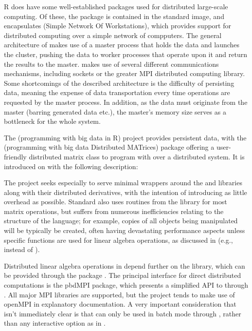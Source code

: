 R does have some well-established packages used for distributed
large-scale computing. Of these, the  package is
contained in the standard \R image, and encapsulates 
(Simple Network Of Workstations), which provides support for distributed
computing over a simple network of compputers. The general architecture
of  makes use of a master process that holds the data and
launches the cluster, pushing the data to worker processes that operate
upon it and return the results to the master.  makes use of
several different communications mechanisms, including sockets or the
greater MPI distributed computing library. Some shortcomings of the
described architecture is the difficulty of persisting data, meaning the
expense of data transportation every time operations are requested by
the master process. In addition, as the data must originate from the
master (barring generated data etc.), the master's memory size serves as
a bottleneck for the whole system.

The  (programming with big data in R) project provides
persistent data, with the  (programming with big data
Distributed MATrices) package offering a user-friendly distributed
matrix class to program with over a distributed system. It is introduced
on with the following description:


The project seeks especially to serve minimal wrappers around the 
and  libraries along with their distributed derivatives, with the
intention of introducing as little overhead as possible. Standard \R also
uses routines from the library for most matrix operations, but suffers
from numerous inefficiencies relating to the structure of the language;
for example, copies of all objects being manipulated will be typically
be created, often having devastating performance aspects unless specific
functions are used for linear algebra operations, as discussed in
\textcite{schmidt2017programming} (e.g.,
 instead of ).

Distributed linear algebra operations in  depend further on the
 library, which can be provided through the  package
\cite{Chen2012pbdSLAPpackage}. The principal interface for direct
distributed computations is the pbdMPI package, which presents a
simplified API to  through \R \cite{Chen2012pbdMPIpackage}. All major
MPI libraries are supported, but the project tends to make use of
openMPI in explanatory documentation. A very important consideration
that isn't immediately clear is that  can only be used in batch
mode through , rather than any interactive option as in 
\cite{yu02:_rmpi}.

